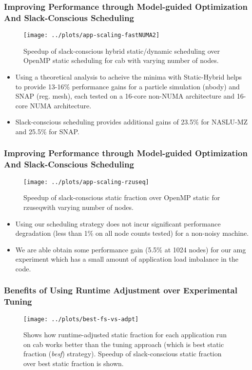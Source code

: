 \begin{frame}
\frametitle{Improving Performance through Model-guided Optimization And Slack-Conscious Scheduling}
\begin{figure}
\texttt{[image: ../plots/app-scaling-fastNUMA2]}
\caption{\small Speedup of slack-conscious hybrid static/dynamic scheduling over OpenMP static scheduling for cab with varying number of nodes.}
\end{figure}
\begin{itemize}
\tiny \item \tiny Using a theoretical analysis to acheive the minima
with Static-Hybrid helps to provide 13-16\% performance gains for a
particle simulation (nbody) and SNAP (reg. mesh), each tested on a
16-core non-NUMA architecture and 16-core NUMA architecture.
\item \tiny Slack-conscious scheduling  provides additional gains
  of 23.5\% for NASLU-MZ and 25.5\% for SNAP.
\end{itemize}
\end{frame}

\begin{frame}
\frametitle{Improving Performance through Model-guided Optimization And Slack-Conscious Scheduling}
\begin{figure}
\texttt{[image: ../plots/app-scaling-rzuseq]}
\caption{\small Speedup of slack-conscious static fraction over OpenMP
  static for rzuseqwith varying number of nodes.}
\end{figure}
\begin{itemize}
\tiny \item \tiny Using our scheduling strategy does not incur
significant performance degradation (less than 1\% on all node counts
tested) for a non-noisy machine. 
\item \tiny We are able obtain some performance gain (5.5\% at 1024 
  nodes) for our amg experiment which has a small amount of application load imbalance in the code.
\end{itemize}
\end{frame}

\begin{frame}[label=bestfsvsadpt]
\frametitle{Benefits of Using Runtime Adjustment over Experimental Tuning}
\begin{figure}
\texttt{[image: ../plots/best-fs-vs-adpt]}
\caption{\small Shows how runtime-adjusted static fraction for each application run on cab
works better than the tuning approach (which is best static fraction
(\textit{besf}) strategy). Speedup of slack-conscious static fraction
over best static fraction is shown.}
\end{figure}
\end{frame}

